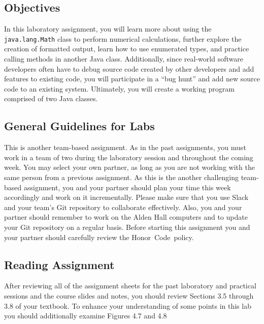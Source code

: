 



\vspace*{-.25in}
\subsection*{Objectives}

In this laboratory assignment, you will learn more about using the {\tt java.lang.Math} class to perform numerical
calculations, further explore the creation of formatted output, learn how to use enumerated types, and practice calling
methods in another Java class.  Additionally, since real-world software developers often have to debug source code
created by other developers and add features to existing code, you will participate in a ``bug hunt'' and add new
source code to an existing system. Ultimately, you will create a working program comprised of two Java classes.

\vspace*{-.1in}
\subsection*{General Guidelines for Labs}

This is another team-based assignment. As in the past assignments, you must work in a team of two during the laboratory
session and throughout the coming week. You may select your own partner, as long as you are not working with the same
person from a previous assignment. As this is the another challenging team-based assignment, you and your partner
should plan your time this week accordingly and work on it incrementally. Please make sure that you use Slack and your
team's Git repository to collaborate effectively. Also, you and your partner should remember to work on the Alden Hall
computers and to update your Git repository on a regular basis. Before starting this assignment you and your partner
should carefully review the \mbox{Honor Code policy}.

\vspace*{-.1in}
\subsection*{Reading Assignment}

After reviewing all of the assignment sheets for the past laboratory and practical sessions and the course slides and
notes, you should review Sections 3.5 through 3.8 of your textbook. To enhance your understanding of some points in
this lab you should additionally examine Figures 4.7 and 4.8

